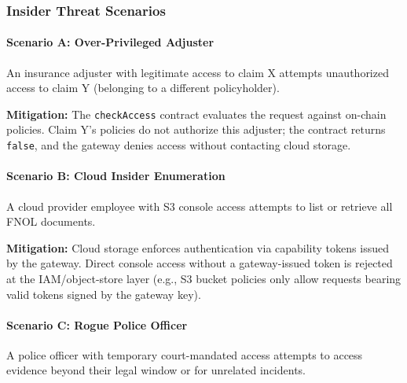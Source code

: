 \documentclass[final,5p,times,twocolumn]{elsarticle}
\begin{document}



\subsubsection{Insider Threat Scenarios}

\paragraph{Scenario A: Over-Privileged Adjuster}
An insurance adjuster with legitimate access to claim X attempts unauthorized access to claim Y (belonging to a different policyholder).

\textbf{Mitigation:} The \texttt{checkAccess} contract evaluates the request against on-chain policies. Claim Y's policies do not authorize this adjuster; the contract returns \texttt{false}, and the gateway denies access without contacting cloud storage.

\paragraph{Scenario B: Cloud Insider Enumeration}
A cloud provider employee with S3 console access attempts to list or retrieve all FNOL documents.

\textbf{Mitigation:} Cloud storage enforces authentication via capability tokens issued by the gateway. Direct console access without a gateway-issued token is rejected at the IAM/object-store layer (e.g., S3 bucket policies only allow requests bearing valid tokens signed by the gateway key).

\paragraph{Scenario C: Rogue Police Officer}
A police officer with temporary court-mandated access attempts to access evidence beyond their legal window or for unrelated incidents.
\end{document}
